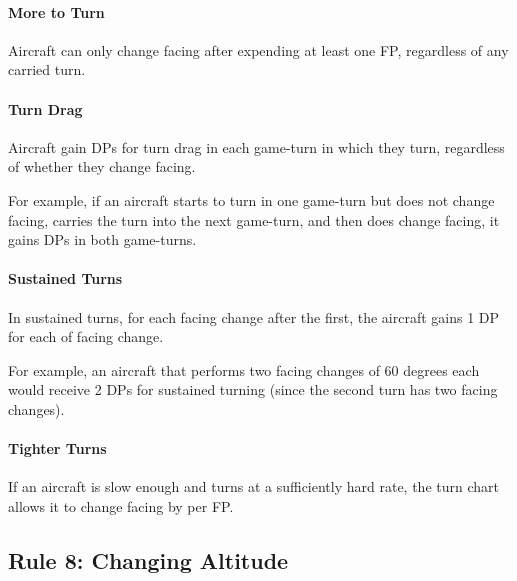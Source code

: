\documentclass[10pt]{article}
\begin{document}
\paragraph{More to Turn} Aircraft can only change facing after expending at least one FP, regardless of any carried turn.

\paragraph{Turn Drag} Aircraft gain DPs for turn drag in each game-turn in which they turn, regardless of whether they change facing. 

For example, if an aircraft starts to turn in one game-turn but does not change facing, carries the turn into the next game-turn, and then does change facing, it gains DPs in both game-turns.

\paragraph{Sustained Turns} In sustained turns, for each facing change after the first, the aircraft gains 1 DP for each  of facing change. 

For example, an aircraft that performs two facing changes of 60 degrees each would receive 2 DPs for sustained turning (since the second turn has two  facing changes).

\paragraph{Tighter Turns} If an aircraft is slow enough and turns at a sufficiently hard rate, the turn chart allows it to change facing by  per FP. 

\subsection{Rule 8: Changing Altitude}
\end{document}
